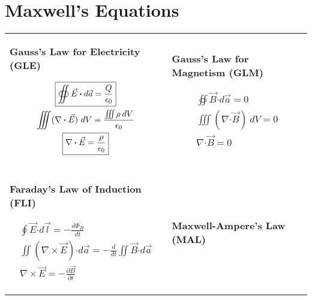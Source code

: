 \documentclass[12pt]{article}
\newcommand{\hs}{\hspace{1pt}}
\newcommand*{\dotP}{\boldsymbol \cdot}		%
\begin{document}
\setlength{\parindent}{0pt}

\section{Maxwell's Equations}

\vspace{15pt}
{
\tabcolsep=0pt
\renewcommand{\arraystretch}{0}
\begin{tabular}{p{.49\linewidth} p{.49\linewidth}}
	{
		\textbf{Gauss's Law for Electricity (GLE)}
		
		\begin{gather*}
			\boxed{ \oiint \vec{E} \dotP d\vec{a} = \frac{Q}{\epsilon_0} }\\
			\iiint (\nabla \dotP \vec{E})\ dV = \frac{\iiint \hspace{-1pt} \rho\hs\hs dV}{\epsilon_0} \\
			\boxed{ \nabla \dotP \vec{E} = \frac{\rho}{\epsilon_0} }
		\end{gather*} 
	} &
	{
		\textbf{Gauss's Law for Magnetism (GLM)}

		\begin{gather*}
			\boxed{ \oiint \vec{B} \dotP d\vec{a} = 0 }\\
			\iiint (\nabla \dotP \vec{B} )\ dV = 0 \\
			\boxed{ \nabla \dotP \vec{B} = 0 }
		\end{gather*}
	} \\ \\[10pt]
	{
		\textbf{Faraday's Law of Induction (FLI)}

		\begin{gather*}
			\boxed{ \oint \vec{E} \dotP d\vec{l} = -\frac{d\Phi_B}{dt} }\\
			\iint (\nabla \times \vec{E}) \dotP d\vec{a} = -\frac{d}{dt} \iint \vec{B} \dotP d\vec{a} \\
			\boxed{ \nabla \times \vec{E} = -\frac{\partial \vec{B}}{\partial t} }
		\end{gather*}
	} &
	{
		\textbf{Maxwell-Ampere's Law (MAL)}

}
\end{tabular}}
\end{document}
